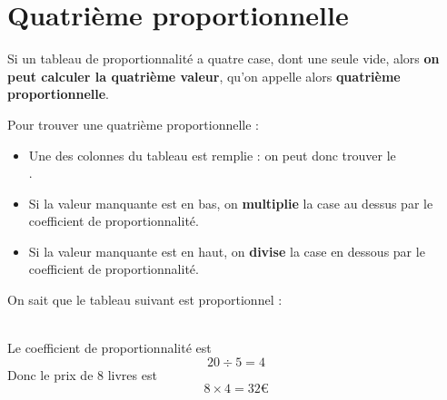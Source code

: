 \documentclass[../€Cours-complet/Cours-complet]{subfiles}
\begin{document}
\section{Quatrième proportionnelle}

\begin{cours}
	Si un tableau de proportionnalité a quatre case, dont une seule vide, alors \textbf{on peut calculer la quatrième valeur}, qu'on appelle alors \textbf{quatrième proportionnelle}.
\end{cours}

\begin{methode}
	Pour trouver une quatrième proportionnelle :
	\begin{itemize}
		\item Une des colonnes du tableau est remplie : on peut donc trouver le \\ .
		\item Si la valeur manquante est en bas, on \textbf{multiplie} la case au dessus par le coefficient de proportionnalité.
		\item Si la valeur manquante est en haut, on \textbf{divise} la case en dessous par le coefficient de proportionnalité.
	\end{itemize}
\end{methode}

\begin{exemple}
	On sait que le tableau suivant est proportionnel :

	  \\
	Le coefficient de proportionnalité est
	$$ 20 ÷ 5 = 4 $$
	Donc le prix de 8 livres est
	$$ 8 × 4 = 32€ $$
\end{exemple}
\end{document}
